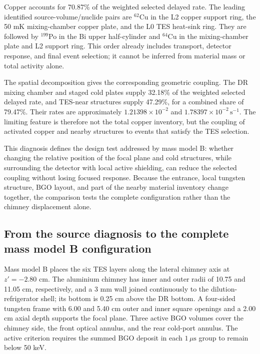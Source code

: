 \documentclass[11pt]{article}
\newcommand{\cps}{\ensuremath{\,\mathrm{s^{-1}}}}
\begin{document}
Copper accounts for 70.87\% of the weighted selected delayed rate. The leading identified source-volume/nuclide pairs are $^{62}$Cu in the L2 copper support ring, the 50 mK mixing-chamber copper plate, and the L0 TES heat-sink ring. They are followed by $^{199}$Po in the Bi upper half-cylinder and $^{64}$Cu in the mixing-chamber plate and L2 support ring. This order already includes transport, detector response, and final event selection; it cannot be inferred from material mass or total activity alone.

The spatial decomposition gives the corresponding geometric coupling. The DR mixing chamber and staged cold plates supply 32.18\% of the weighted selected delayed rate, and TES-near structures supply 47.29\%, for a combined share of 79.47\%. Their rates are approximately $1.21398\times10^{-2}$ and $1.78397\times10^{-2}\cps$. The limiting feature is therefore not the total copper inventory, but the coupling of activated copper and nearby structures to events that satisfy the TES selection.

This diagnosis defines the design test addressed by mass model B: whether changing the relative position of the focal plane and cold structures, while surrounding the detector with local active shielding, can reduce the selected coupling without losing focused response. Because the entrance, local tungsten structure, BGO layout, and part of the nearby material inventory change together, the comparison tests the complete configuration rather than the chimney displacement alone.

\FloatBarrier

\subsection{From the source diagnosis to the complete mass model B configuration}
\label{subsec:optimized_shield_results}

Mass model B places the six TES layers along the lateral chimney axis at $z'=-2.80$ cm. The aluminium chimney has inner and outer radii of 10.75 and 11.05 cm, respectively, and a 3 mm wall joined continuously to the dilution-refrigerator shell; its bottom is 0.25 cm above the DR bottom. A four-sided tungsten frame with 6.00 and 5.40 cm outer and inner square openings and a 2.00 cm axial depth supports the focal plane. Three active BGO volumes cover the chimney side, the front optical annulus, and the rear cold-port annulus. The active criterion requires the summed BGO deposit in each $1\,\mu\mathrm{s}$ group to remain below 50 keV.
\end{document}
